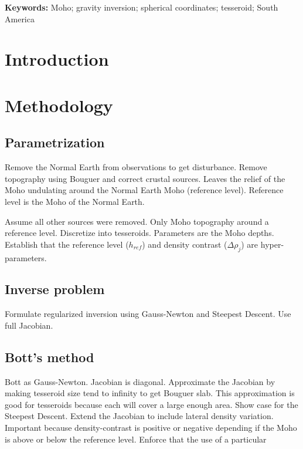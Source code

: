\documentclass[]{article}
\title{\Title}
\author{
    Leonardo Uieda \\ \texttt{leo@leouieda.com}
    \and
    Val\'eria C. F. Barbosa
}
\newcommand{\Keywords}{
        Moho;
        gravity inversion;
        spherical coordinates;
        tesseroid;
        South America
}
\begin{document}
\maketitle

\noindent \textbf{Keywords:} \Keywords

\begin{abstract}
\end{abstract}

\section{Introduction}


\section{Methodology}

\subsection{Parametrization}

Remove the Normal Earth from observations to get disturbance.
Remove topography using Bouguer and correct crustal sources.
Leaves the relief of the Moho undulating around the Normal Earth Moho
(reference level).
Reference level is the Moho of the Normal Earth.

Assume all other sources were removed.
Only Moho topography around a reference level.
Discretize into tesseroids.
Parameters are the Moho depths.
Establish that the reference level ($h_{ref}$)  and density contrast
($\Delta\rho_j$) are hyper-parameters.

\subsection{Inverse problem}

Formulate regularized inversion using Gauss-Newton and Steepest Descent.
Use full Jacobian.

\subsection{Bott's method}

Bott as Gauss-Newton.
Jacobian is diagonal.
Approximate the Jacobian by making tesseroid size tend to infinity to get
Bouguer slab.
This approximation is good for tesseroids because each will cover a large
enough area.
Show case for the Steepest Descent.
Extend the Jacobian to include lateral density variation.
Important because density-contrast is positive or negative depending if the
Moho is above or below the reference level.
Enforce that the use of a particular
\end{document}
